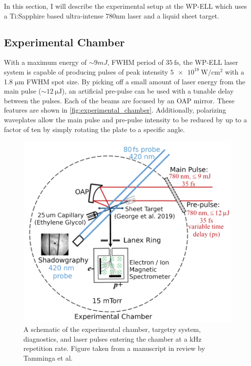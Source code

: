 In this section, I will describe the experimental setup at the \gls{WP-ELL} which uses a Ti:Sapphire based ultra-intense $780 \unit{\nano \meter}$ laser and a liquid sheet target.  

\subsection{Experimental Chamber}

With a maximum energy of $\sim 9 \unit{mJ}$, \gls{FWHM} period of $\SI{35}{\femto \second}$, the \gls{WP-ELL} laser system is capable of producing pulses of peak intensity $\SI{5e18}{\watt \per \centi \meter \squared}$ with a 1.8 $\unit{\micro \meter}$ \gls{FWHM} spot size. By picking off a small amount of laser energy from the main pulse ($\sim \SI{12}{\micro \joule}$), an artificial pre-pulse can be used with a tunable delay between the pulses. Each of the beams are focused by an \gls{OAP} mirror. These features are shown in \autoref{fig:experimental_chamber}. Additionally, polarizing waveplates allow the main pulse and pre-pulse intensity to be reduced by up to a factor of ten by simply rotating the plate to a specific angle.

\begin{figure}
	\centering 
	\includegraphics[width=0.75\linewidth]{planning/images/daq/experimental_chamber.PNG}
	\caption{A schematic of the experimental chamber, targetry system, diagnostics, and laser pulses entering the chamber at a kHz repetition rate. Figure taken from a manuscript in review by Tamminga et al.}
	\label{fig:experimental_chamber}
\end{figure}

